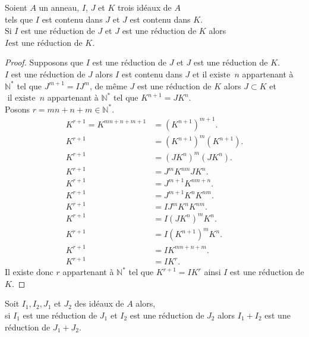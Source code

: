 \begin{maproposition}
	Soient $A$ un anneau, $I$, $J$ et $K$ trois id\'eaux de $A$ \\ tels que 
	$I $ est contenu dans $ J $ et $J$ est contenu dans $ K $.\\ Si $I$ est une réduction de $J$ et $J$ est une réduction de $K$ alors $ I \text{est une réduction de }  K $.
\end{maproposition}
\begin{proof}
	Supposons que $I$ est une réduction de $J$ et $J$ est une réduction de $K$.\\
	$I$ est une réduction de $J$ alors $I $ est contenu dans $ J$ et $\text{il existe } \, n$ appartenant à $ \mathbb{N}^{*}$ tel que $J^{m+1} = IJ^{m}$, de même $J$ est une réduction de $K$ alors $J \subset K$ et $\text{ il existe } \, n$ appartenant à $ \mathbb{N}^{*}$ tel que $K^{n+1} = JK^{n}$.\\
	Posons $r = mn+n+m \in \mathbb{N}^{*}$.
	\begin{align*}
		K^{r+1} = K^{mn+n+m+1}& = (K^{n+1})^{m+1}.\\
		K^{r+1} & = (K^{n+1})^{m}(K^{n+1}).\\
		K^{r+1} & = (JK^{n})^{m}(JK^{n}).\\
		K^{r+1} & = J^{m}K^{nm}JK^{n}.\\
		K^{r+1} & = J^{m+1}K^{nm+n}.\\
		K^{r+1} & = J^{m+1}K^{n}K^{nm}.\\
		K^{r+1} & = IJ^{m}K^{n}K^{nm}.\\
		K^{r+1} & = I(JK^{n})^{m}K^{n}.\\
		K^{r+1} & = I(K^{n+1})^{m}K^{n}.\\
		K^{r+1} & = IK^{mn+n+m}.\\
		K^{r+1} & = IK^r.          
	\end{align*}
	Il existe donc $r $ appartenant à $ \mathbb{N}^{*}$ tel que $K^{r+1} = IK^{r}$ ainsi $I$ est une réduction de $K$.
\end{proof}
\begin{monlemme}
	Soit $I_1, I_2, J_1$ et $J_2$ des idéaux de $A$ alors, \\ si $I_1$ est  une réduction de $J_1$ et $I_2$ est une réduction de $J_2$ alors $I_1+I_2$ est une réduction de $J_1+J_2$.
\end{monlemme}
